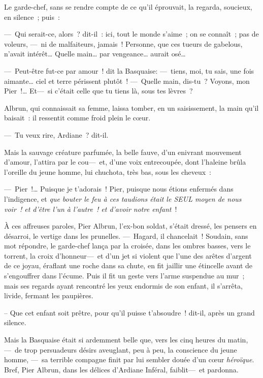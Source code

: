 \documentclass[french,twoside]{book} %
\begin{document}
Le garde-chef, sans se rendre compte de ce qu’il éprouvait, la regarda, soucieux, en silence ; puis :\par
— Qui serait-ce, alors ? dit-il : ici, tout le monde s’aime ; on se connaît ; pas de voleurs, — ni de malfaiteurs, jamais ! Personne, que ces tueurs de gabelous, n’avait intérêt… Quelle main… par vengeance… aurait osé…\par
— Peut-être fut-ce par amour ! dit la Basquaise: — tiens, moi, tu sais, une fois aimante… ciel et terre périssent plutôt ! — Quelle main, dis-tu ? Voyons, mon Pier !… Et— si c’était celle que tu tiens là, sous tes lèvres ?\par
Albrun, qui connaissait sa femme, laissa tomber, en un saisissement, la main qu’il baisait : il ressentit comme froid plein le cœur.\par
— Tu veux rire, Ardiane ? dit-il.\par
   Mais la sauvage créature parfumée, la belle fauve, d’un enivrant mouvement d’amour, l’attira par le cou— et, d’une voix entrecoupée, dont l’haleine brûla l’oreille du jeune homme, lui chuchota, très bas, sous les cheveux :\par
— Pier !… Puisque je t’adorais ! Pier, puisque nous étions enfermés dans l’indigence, et \emph{que bouter le feu à ces taudions était le SEUL moyen de nous voir ! et d’être l’un à l’autre ! et d’avoir notre enfant} !\par
À ces affreuses paroles, Pier Albrun, l’ex-bon soldat, s’était dressé, les pensers en désarroi, le vertige dans les prunelles. — Hagard, il chancelait ! Soudain, sans mot répondre, le garde-chef lança par la croisée, dans les ombres basses, vers le torrent, la croix d’honneur— et d’un jet si violent que l’une des arêtes d’argent de ce joyau, éraflant une roche dans sa chute, en fit jaillir une étincelle avant de s’engouffrer dans l’écume. Puis il fit un geste vers l’arme suspendue au mur ; mais ses regards ayant rencontré les yeux endormis de son enfant, il s’arrêta, livide, fermant les paupières.\par
   – Que cet enfant soit prêtre, pour qu’il puisse t’absoudre ! dit-il, après un grand silence.\par
Mais la Basquaise était si ardemment belle que, vers les cinq heures du matin, — de trop persuadeurs désirs aveuglant, peu à peu, la conscience du jeune homme, — sa terrible compagne finit par lui sembler douée d’un cœur \emph{héroïque}. Bref, Pier Albrun, dans les délices d’Ardiane Inféral, faiblit— et pardonna.\par
\end{document}
